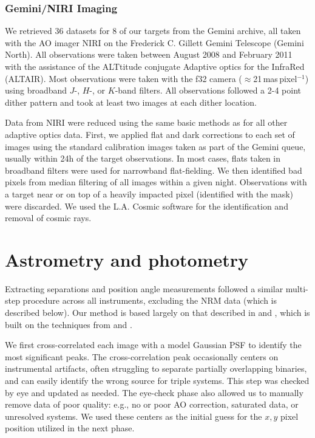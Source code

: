 \documentclass[twocolumn]{aastex62}
\begin{document}
\subsubsection{Gemini/NIRI Imaging}
We retrieved 36 datasets for 8 of our targets from the Gemini archive, all taken with the AO imager NIRI \citep{2003PASP..115.1388H} on the Frederick C. Gillett Gemini Telescope (Gemini North). All observations were taken between August 2008 and February 2011 with the assistance of the ALTtitude conjugate Adaptive optics for the InfraRed (ALTAIR). Most observations were taken with the f32 camera ($\approx$21\,mas\,pixel$^{-1}$) using broadband $J$-, $H$-, or $K$-band filters. All observations followed a 2-4 point dither pattern and took at least two images at each dither location. 

Data from NIRI were reduced using the same basic methods as for all other adaptive optics data. First, we applied flat and dark corrections to each set of images using the standard calibration images taken as part of the Gemini queue, usually within 24h of the target observations. In most cases, flats taken in broadband filters were used for narrowband flat-fielding. We then identified bad pixels from median filtering of all images within a given night. Observations with a target near or on top of a heavily impacted pixel (identified with the mask) were discarded. We used the L.A. Cosmic software for the identification and removal of cosmic rays. 

\section{Astrometry and photometry}\label{sec:astrometry}

Extracting separations and position angle measurements followed a similar multi-step procedure across all instruments, excluding the NRM data (which is described below). Our method is based largely on that described in \citet{2016ApJ...817...80D} and \citet{Dupuy2017}, which is built on the techniques from \citet{2008ApJ...689..436L} and \citet{2010ApJ...721.1725D}.

We first cross-correlated each image with a model Gaussian PSF to identify the most significant peaks. The cross-correlation peak occasionally centers on instrumental artifacts, often struggling to separate partially overlapping binaries, and can easily identify the wrong source for triple systems. This step was checked by eye and updated as needed. The eye-check phase also allowed us to manually remove data of poor quality: e.g., no or poor AO correction, saturated data, or unresolved systems. We used these centers as the initial guess for the $x, y$ pixel position utilized in the next phase. 
\end{document}

